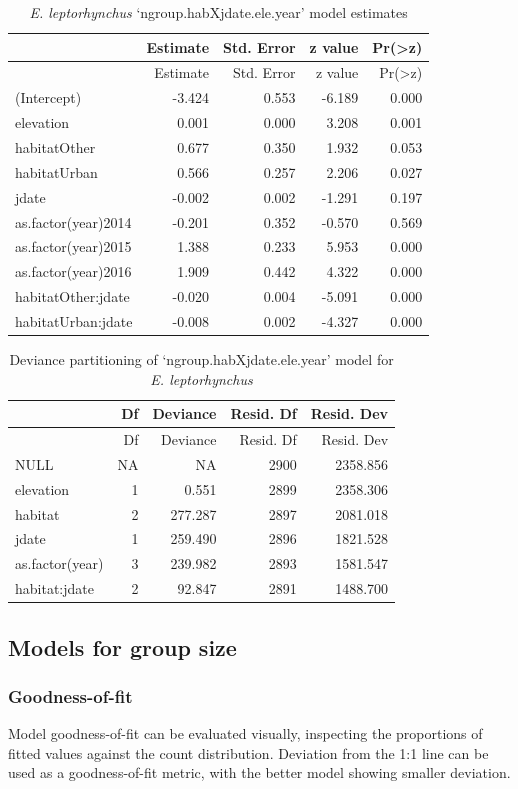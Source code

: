 \documentclass[]{article}
\begin{document}
\begin{longtable}[]{@{}lrrrr@{}}
\caption{\textit{E. leptorhynchus} `ngroup.habXjdate.ele.year' model
estimates}\tabularnewline
\toprule
& Estimate & Std. Error & z value &
Pr(\textgreater{}\textbar{}z\textbar{})\tabularnewline
\midrule
\endfirsthead
\toprule
& Estimate & Std. Error & z value &
Pr(\textgreater{}\textbar{}z\textbar{})\tabularnewline
\midrule
\endhead
(Intercept) & -3.424 & 0.553 & -6.189 & 0.000\tabularnewline
elevation & 0.001 & 0.000 & 3.208 & 0.001\tabularnewline
habitatOther & 0.677 & 0.350 & 1.932 & 0.053\tabularnewline
habitatUrban & 0.566 & 0.257 & 2.206 & 0.027\tabularnewline
jdate & -0.002 & 0.002 & -1.291 & 0.197\tabularnewline
as.factor(year)2014 & -0.201 & 0.352 & -0.570 & 0.569\tabularnewline
as.factor(year)2015 & 1.388 & 0.233 & 5.953 & 0.000\tabularnewline
as.factor(year)2016 & 1.909 & 0.442 & 4.322 & 0.000\tabularnewline
habitatOther:jdate & -0.020 & 0.004 & -5.091 & 0.000\tabularnewline
habitatUrban:jdate & -0.008 & 0.002 & -4.327 & 0.000\tabularnewline
\bottomrule
\end{longtable}

\begin{longtable}[]{@{}lrrrr@{}}
\caption{Deviance partitioning of `ngroup.habXjdate.ele.year' model for
\textit{E. leptorhynchus}}\tabularnewline
\toprule
& Df & Deviance & Resid. Df & Resid. Dev\tabularnewline
\midrule
\endfirsthead
\toprule
& Df & Deviance & Resid. Df & Resid. Dev\tabularnewline
\midrule
\endhead
NULL & NA & NA & 2900 & 2358.856\tabularnewline
elevation & 1 & 0.551 & 2899 & 2358.306\tabularnewline
habitat & 2 & 277.287 & 2897 & 2081.018\tabularnewline
jdate & 1 & 259.490 & 2896 & 1821.528\tabularnewline
as.factor(year) & 3 & 239.982 & 2893 & 1581.547\tabularnewline
habitat:jdate & 2 & 92.847 & 2891 & 1488.700\tabularnewline
\bottomrule
\end{longtable}

\subsection{Models for group size}\label{models-for-group-size-1}

\subsubsection{Goodness-of-fit}\label{goodness-of-fit-1}

Model goodness-of-fit can be evaluated visually, inspecting the
proportions of fitted values against the count distribution. Deviation
from the 1:1 line can be used as a goodness-of-fit metric, with the
better model showing smaller deviation.
\end{document}
